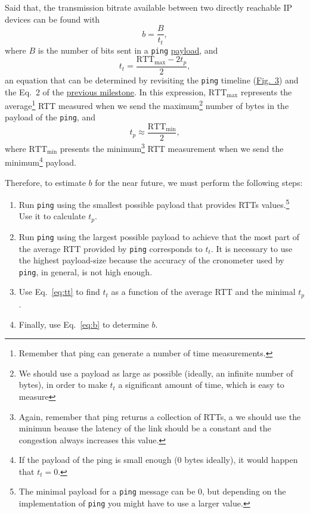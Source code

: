 Said that, the transmission bitrate available between two directly
reachable IP devices can be found with
\begin{equation}
  b=\frac{B}{t_t},
  \label{eq:b}
\end{equation}
where $B$ is the number of bits sent in a \verb|ping|
\href{https://en.wikipedia.org/wiki/Payload_(computing)}{payload}, and
\begin{equation}
  t_t = \frac{\text{RTT}_{\text{max}}-2t_p}{2},
  \label{eq:tt}
\end{equation}
an equation that can be determined by revisiting the \verb|ping|
timeline
(\href{https://tecnologias-multimedia.github.io/contents/latency/graphics/ping_timeline.svg}{Fig.~3})
and the Eq.~2 of the
\href{https://tecnologias-multimedia.github.io/contents/latency/}{previous
  milestone}. In this expression, $\text{RTT}_{\text{max}}$ represents
  the average\footnote{Remember that ping can generate a number of
    time measurements.} RTT measured when we send the
  maximum\footnote{We should use a payload as large as possible
    (ideally, an infinite number of bytes), in order to make $t_t$ a
    significant amount of time, which is easy to measure} number of
  bytes in the payload of the \verb|ping|, and
\begin{equation}
  t_p \approx \frac{\text{RTT}_{\text{min}}}{2},
  \label{eq:tp}
\end{equation}
where $\text{RTT}_{\text{min}}$ presents the minimum\footnote{Again,
  remember that ping returns a collection of RTTs, a we should use the
  minimun beause the latency of the link should be a constant and the
  congestion always increases this value.} RTT measurement when we
send the minimum\footnote{If the payload of the ping is small enough
  ($0$ bytes ideally), it would happen that $t_t=0$.} payload.

Therefore, to estimate $b$ for the near future, we must perform the
following steps:

\begin{enumerate}
  
\item Run \texttt{ping} using the smallest possible payload that
  provides RTTs values.\footnote{The minimal payload for a
    \texttt{ping} message can be 0, but depending on the
    implementation of \texttt{ping} you might have to use a larger
    value.} Use it to calculate $t_p$.
  
\item Run \texttt{ping} using the largest possible payload to achieve
  that the most part of the average RTT provided by \texttt{ping}
  corresponds to $t_t$. It is necessary to use the highest
  payload-size because the accuracy of the cronometer used by
  \texttt{ping}, in general, is not high enough.
  
\item Use Eq.~\eqref{eq:tt} to find $t_t$ as a function of the average
  RTT and the minimal $t_p$.
  
\item Finally, use Eq.~\eqref{eq:b} to determine $b$.
  
\end{enumerate}

